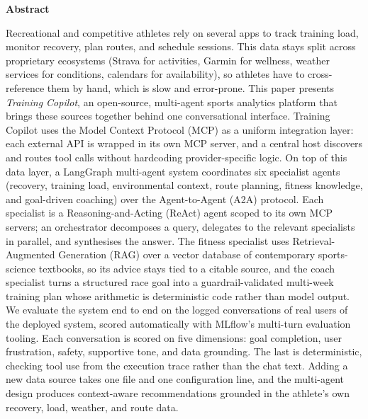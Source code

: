 {\Large \textbf{Abstract}}

\bigskip

Recreational and competitive athletes rely on several apps to track training load, monitor recovery, plan routes, and schedule sessions. This data stays split across proprietary ecosystems (Strava for activities, Garmin for wellness, weather services for conditions, calendars for availability), so athletes have to cross-reference them by hand, which is slow and error-prone. This paper presents \textit{Training Copilot}, an open-source, multi-agent sports analytics platform that brings these sources together behind one conversational interface. Training Copilot uses the Model Context Protocol (MCP) as a uniform integration layer: each external API is wrapped in its own MCP server, and a central host discovers and routes tool calls without hardcoding provider-specific logic. On top of this data layer, a LangGraph multi-agent system coordinates six specialist agents (recovery, training load, environmental context, route planning, fitness knowledge, and goal-driven coaching) over the Agent-to-Agent (A2A) protocol. Each specialist is a Reasoning-and-Acting (ReAct) agent scoped to its own MCP servers; an orchestrator decomposes a query, delegates to the relevant specialists in parallel, and synthesises the answer. The fitness specialist uses Retrieval-Augmented Generation (RAG) over a vector database of contemporary sports-science textbooks, so its advice stays tied to a citable source, and the coach specialist turns a structured race goal into a guardrail-validated multi-week training plan whose arithmetic is deterministic code rather than model output. We evaluate the system end to end on the logged conversations of real users of the deployed system, scored automatically with MLflow's multi-turn evaluation tooling. Each conversation is scored on five dimensions: goal completion, user frustration, safety, supportive tone, and data grounding. The last is deterministic, checking tool use from the execution trace rather than the chat text. Adding a new data source takes one file and one configuration line, and the multi-agent design produces context-aware recommendations grounded in the athlete's own recovery, load, weather, and route data.